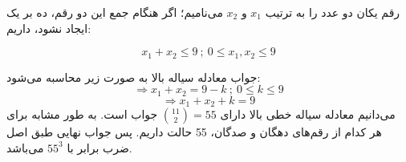 \p
	رقم یکان دو عدد را به ترتیب 
	$x_1$
	و
	$x_2$
	می‌نامیم؛
	اگر هنگام جمع این دو رقم، ده بر یک ایجاد نشود، داریم:
	
	$$x_1 + x_2 \leq 9 \: ; \: 0 \leq x_1 , x_2 \leq 9$$
	
	 جواب معادله سیاله بالا به صورت زیر محاسبه می‌شود:
	 $$\Rightarrow x_1 + x_2 = 9 - k \: ; \: 0 \leq k \leq 9 $$
	$$ \Rightarrow x_1 + x_2 + k = 9$$
	می‌دانیم معادله سیاله خطی بالا دارای
    $\binom{11}{2} = 55$
	جواب است.
    به طور مشابه 
	برای هر کدام از رقم‌های دهگان و صدگان، 55 حالت داریم. پس جواب نهایی طبق اصل ضرب برابر با
	$55^3$
	می‌باشد.